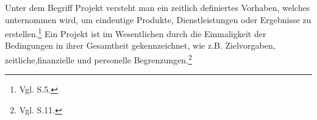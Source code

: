 Unter dem Begriff Projekt versteht man ein zeitlich definiertes Vorhaben, welches unternommen wird,
um eindeutige Produkte, Dienstleistungen oder Ergebnisse zu erstellen.\footnote{Vgl. \cite{ProjectManagementInstitute.2008} S.5.}
Ein Projekt ist im Wesentlichen durch die Einmaligkeit der Bedingungen in ihrer Gesamtheit gekennzeichnet, wie z.B. Zielvorgaben, zeitliche,finanzielle und personelle Begrenzungen.\footnote{Vgl. \cite{DIN.200901} S.11.}